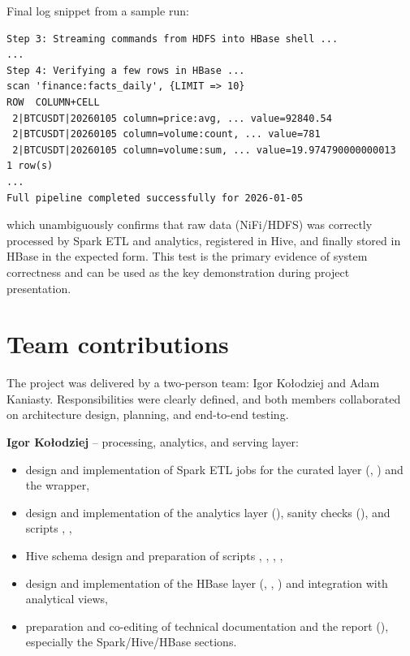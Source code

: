 \documentclass{article}
\begin{document}
Final log snippet from a sample run:

\begin{lstlisting}
Step 3: Streaming commands from HDFS into HBase shell ...
...
Step 4: Verifying a few rows in HBase ...
scan 'finance:facts_daily', {LIMIT => 10}
ROW  COLUMN+CELL
 2|BTCUSDT|20260105 column=price:avg, ... value=92840.54
 2|BTCUSDT|20260105 column=volume:count, ... value=781
 2|BTCUSDT|20260105 column=volume:sum, ... value=19.974790000000013
1 row(s)
...
Full pipeline completed successfully for 2026-01-05
\end{lstlisting}

which unambiguously confirms that raw data (NiFi/HDFS) was correctly
processed by Spark ETL and analytics, registered in Hive, and finally
stored in HBase in the expected form. This test is the primary evidence
of system correctness and can be used as the key demonstration during
project presentation.

\section{Team contributions}

The project was delivered by a two-person team: Igor Ko{\l}odziej and
Adam Kaniasty. Responsibilities were clearly defined, and both members
collaborated on architecture design, planning, and end-to-end testing.

\textbf{Igor Ko{\l}odziej} -- processing, analytics, and serving layer:
\begin{itemize}
\item
  design and implementation of Spark ETL jobs for the curated layer
  (, ) and the
   wrapper,
\item
  design and implementation of the analytics layer
  (), sanity checks
  (), and scripts
  , ,
\item
  Hive schema design and preparation of scripts
  , ,
  , ,
\item
  design and implementation of the HBase layer
  (, ,
  ) and integration with analytical views,
\item
  preparation and co-editing of technical documentation and the report
  (), especially the Spark/Hive/HBase sections.
\end{itemize}
\end{document}
